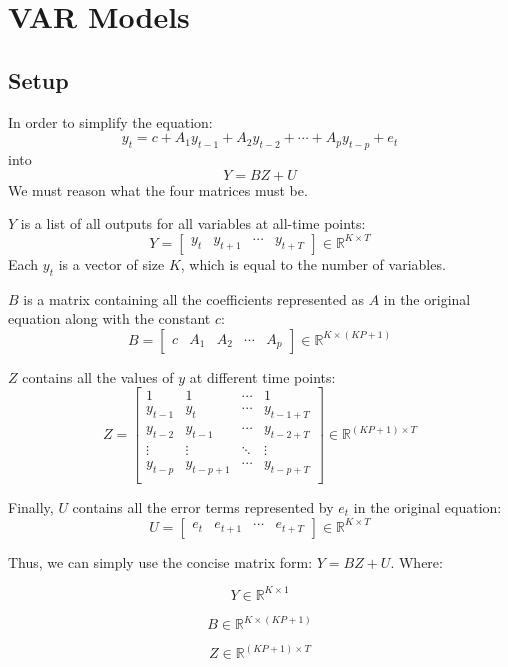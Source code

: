 \section{VAR Models}
\subsection{Setup}
In order to simplify the equation:  
\[y_t = c + A_1y_{t-1} + A_2y_{t−2} + \cdots + A_py_{t−p} + e_t\] 
into  
\[Y = BZ + U\]  
We must reason what the four matrices must be.  
  
$Y$ is a list of all outputs for all variables at all-time points:  
\[Y = \begin{bmatrix} y_t & y_{t+1} & \cdots & y_{t+T} \end{bmatrix} \in \mathbb{R}^{K\times T}\]
Each $y_t$ is a vector of size $K$, which is equal to the number of variables.
  
$B$ is a matrix containing all the coefficients represented as $A$ in the original equation along with the constant $c$:  
\[B = \begin{bmatrix} c & A_1 & A_2 & \cdots & A_p \end{bmatrix} \in \mathbb{R}^{K \times (KP + 1)}\]
  
$Z$ contains all the values of $y$ at different time points:  
\[Z = \begin{bmatrix}
    1 & 1 & \cdots & 1 \\
    y_{t-1} & y_{t} & \cdots & y_{t-1+T} \\
    y_{t-2} & y_{t-1} & \cdots & y_{t-2+T} \\
    \vdots & \vdots & \ddots & \vdots \\
    y_{t-p} & y_{t-p+1} & \cdots & y_{t-p+T} \\
\end{bmatrix} \in \mathbb{R}^{(KP + 1) \times T}\]

Finally, $U$ contains all the error terms represented by $e_t$ in the original equation:  
\[U = \begin{bmatrix} e_t & e_{t+1} & \cdots & e_{t+T} \end{bmatrix} \in \mathbb{R}^{K\times T}\]  

Thus, we can simply use the concise matrix form: $Y = BZ + U$.  
Where:  
  
\[Y \in \mathbb{R}^{K\times 1}\]

\[B \in \mathbb{R}^{K \times (KP + 1)}\]

\[Z \in \mathbb{R}^{(KP + 1) \times T}\]


